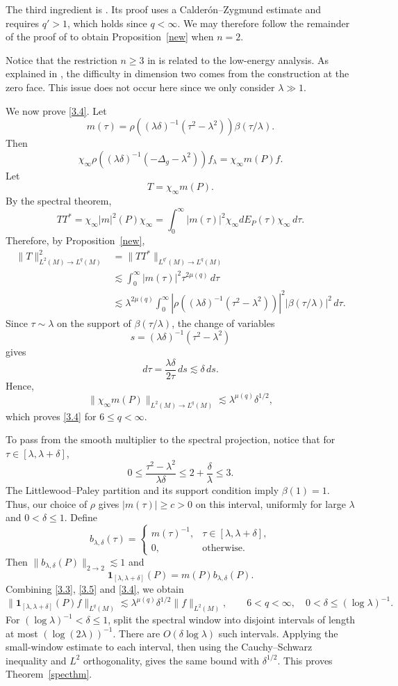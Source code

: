 \documentclass[11pt]{amsart}
\newcommand{\la}{\lambda}
\begin{document}
The third ingredient is
\cite[Lemma 8.3]{Guillarmou2010RestrictionAS}. Its proof uses a
Calder\'on--Zygmund estimate and requires $q'>1$, which holds since
$q<\infty$. We may therefore follow the remainder of the proof of
\cite[Proposition 8.2]{Guillarmou2010RestrictionAS} to obtain
Proposition~\ref{new} when $n=2$.

Notice that the restriction $n\geq3$ in
\cite[Theorem 1.3]{Guillarmou2010RestrictionAS} is related to the
low-energy analysis. As explained in
\cite[Section 9]{Guillarmou2010RestrictionAS}, the difficulty in
dimension two comes from the construction at the zero face. This
issue does not occur here since we only consider $\la\gg1$.

We now prove \eqref{3.4}. Let
\[
m(\tau)
=
\rho((\la\delta)^{-1}(\tau^2-\la^2))
\beta(\tau/\la).
\]
Then
\[
\chi_\infty
\rho((\la\delta)^{-1}(-\Delta_g-\la^2))f_\la
=
\chi_\infty m(P)f.
\]
Let
\[
T=\chi_\infty m(P).
\]
By the spectral theorem,
\[
TT^*
=
\chi_\infty |m|^2(P)\chi_\infty
=
\int_0^\infty
|m(\tau)|^2
\chi_\infty dE_P(\tau)\chi_\infty\,d\tau.
\]
Therefore, by Proposition~\ref{new},
\begin{align*}
\|T\|_{L^2(M)\to L^q(M)}^2
&=
\|TT^*\|_{L^{q'}(M)\to L^q(M)}\\
&\lesssim
\int_0^\infty
|m(\tau)|^2\tau^{2\mu(q)}\,d\tau\\
&\lesssim
\la^{2\mu(q)}
\int_0^\infty
\left|
\rho((\la\delta)^{-1}(\tau^2-\la^2))
\right|^2
|\beta(\tau/\la)|^2\,d\tau.
\end{align*}
Since $\tau\sim\la$ on the support of $\beta(\tau/\la)$, the change
of variables
\[
s=(\la\delta)^{-1}(\tau^2-\la^2)
\]
gives
\[
d\tau=\frac{\la\delta}{2\tau}\,ds\lesssim\delta\,ds.
\]
Hence,
\[
\|\chi_\infty m(P)\|_{L^2(M)\to L^q(M)}
\lesssim
\la^{\mu(q)}\delta^{1/2},
\]
which proves \eqref{3.4} for $6\leq q<\infty$.

To pass from the smooth multiplier to the spectral projection, notice that for $\tau\in[\la,\la+\delta]$,
\[
0\leq\frac{\tau^2-\la^2}{\la\delta}\leq2+\frac{\delta}{\la}\leq3.
\]
The Littlewood--Paley partition and its support condition imply $\beta(1)=1$. Thus, our choice of $\rho$ gives $|m(\tau)|\geq c>0$ on this interval, uniformly for large $\la$ and $0<\delta\leq1$. Define
\[
b_{\la,\delta}(\tau)=
\begin{cases}
m(\tau)^{-1},&\tau\in[\la,\la+\delta],\\
0,&\text{otherwise}.
\end{cases}
\]
Then $\|b_{\la,\delta}(P)\|_{2\to2}\lesssim1$ and
\[
\mathbf{1}_{[\la,\la+\delta]}(P)=m(P)b_{\la,\delta}(P).
\]
Combining \eqref{3.3}, \eqref{3.5} and \eqref{3.4}, we obtain
\[
\|\mathbf{1}_{[\la,\la+\delta]}(P)f\|_{L^q(M)}
\lesssim\la^{\mu(q)}\delta^{1/2}\|f\|_{L^2(M)},
\qquad 6<q<\infty,\quad 0<\delta\leq(\log\la)^{-1}.
\]
For $(\log\la)^{-1}<\delta\leq1$, split the spectral window into disjoint intervals of length at most $(\log(2\la))^{-1}$. There are $O(\delta\log\la)$ such intervals. Applying the small-window estimate to each interval, then using the Cauchy--Schwarz inequality and $L^2$ orthogonality, gives the same bound with $\delta^{1/2}$. This proves Theorem~\ref{specthm}.
\end{document}
